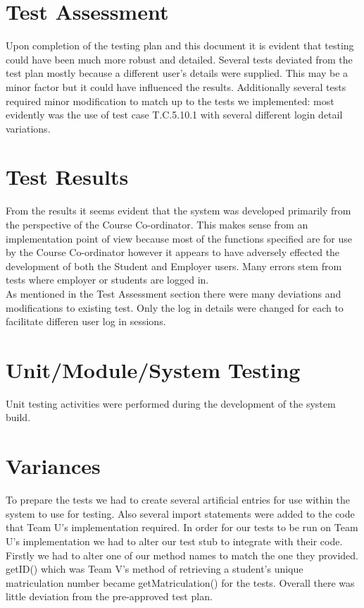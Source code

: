 \documentclass{l3deliverable}
\begin{document}
\section{Test Assessment}
Upon completion of the testing plan and this document it is evident that testing could have been much more robust and detailed. Several tests deviated from the test plan mostly because a different user's details were supplied. This may be a minor factor but it could have influenced the results. Additionally several tests required minor modification to match up to the tests we implemented: most evidently was the use of test case T.C.5.10.1 with several different login detail variations.

\section{Test Results}
From the results it seems evident that the system was developed primarily from the perspective of the Course Co-ordinator. This makes sense from an implementation point of view because most of the functions specified are for use by the Course Co-ordinator however it appears to have adversely effected the development of both the Student and Employer users. Many errors stem from tests where employer or students are logged in.\\
As mentioned in the Test Assessment section there were many deviations and modifications to existing test. Only the log in details were changed for each to facilitate differen user log in sessions. 

\section{Unit/Module/System Testing}
Unit testing activities were performed during the development of the system build.

\section{Variances}
To prepare the tests we had to create several artificial entries for use within the system to use for testing. Also several import statements were added to the code that Team U's implementation required.
In order for our tests to be run on Team U's implementation we had to alter our test stub to integrate with their code. Firstly we had to alter one of our method names to match the one they provided. getID() which was Team V's method of retrieving a student's unique matriculation number became getMatriculation() for the tests.  
Overall there was little deviation from the pre-approved test plan.
\end{document}
